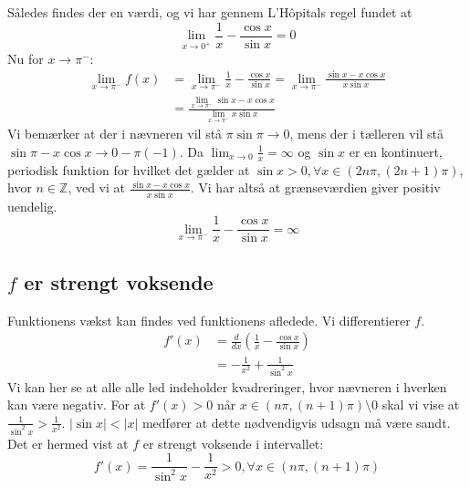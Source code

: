 \documentclass{report}
\begin{document}
Således findes der en værdi, og vi har gennem L'Hôpitals regel fundet at\begin{equation}
    \lim_{x\to0^+}\frac{1}{x}-\frac{\cos{x}}{\sin{x}}=0
\end{equation}
Nu for $x\to\pi^-$:
\begin{align*}
    \lim_{x\to\pi^-}f(x)&=\lim_{x\to\pi^-}\frac{1}{x}-\frac{\cos{x}}{\sin{x}}=\lim_{x\to\pi^-}\frac{\sin{x}-x\cos{x}}{x\sin{x}}\\
    &=\frac{\lim_{x\to\pi^-}\sin{x}-x\cos{x}}{\lim_{x\to\pi^-}x\sin{x}}
\end{align*}
Vi bemærker at der i nævneren vil stå $\pi\sin{\pi}\to0$, mens der i tælleren vil stå $\sin{\pi}-x\cos{x}\to0-\pi(-1)$. Da $\lim_{x\to0}\frac{1}{x}=\infty$ og $\sin{x}$ er en kontinuert, periodisk funktion for hvilket det gælder at $\sin{x}>0,\forall x\in(2n\pi, (2n+1)\pi)$, hvor $n\in\mathbb{Z}$, ved vi at $\frac{\sin{x}-x\cos{x}}{x\sin{x}}$. Vi har altså at grænseværdien giver positiv uendelig.
\begin{equation}
    \lim_{x\to\pi^-}\frac{1}{x}-\frac{\cos{x}}{\sin{x}}=\infty
\end{equation}
\subsection{$f$ er strengt voksende}
Funktionens vækst kan findes ved funktionens afledede. Vi differentierer $f$.
\begin{align*}
    f'(x)&=\frac{d}{dx}\left(\frac{1}{x}-\frac{\cos{x}}{\sin{x}}\right)\\
    &=-\frac{1}{x^2}+\frac{1}{\sin^2{x}}
\end{align*}
Vi kan her se at alle alle led indeholder kvadreringer, hvor nævneren i hverken kan være negativ. For at $f'(x)>0$ når $x\in(n\pi,(n+1)\pi)\setminus0$ skal vi vise at $\frac{1}{\sin^2{x}}>\frac{1}{x^2}$. $|\sin{x}|<|x|$ medfører at dette nødvendigvis udsagn må være sandt. Det er hermed vist at $f$ er strengt voksende i intervallet:\begin{equation}
    f'(x)=\frac{1}{\sin^2{x}}-\frac{1}{x^2}>0,\forall x\in(n\pi,(n+1)\pi)
\end{equation}
\end{document}
